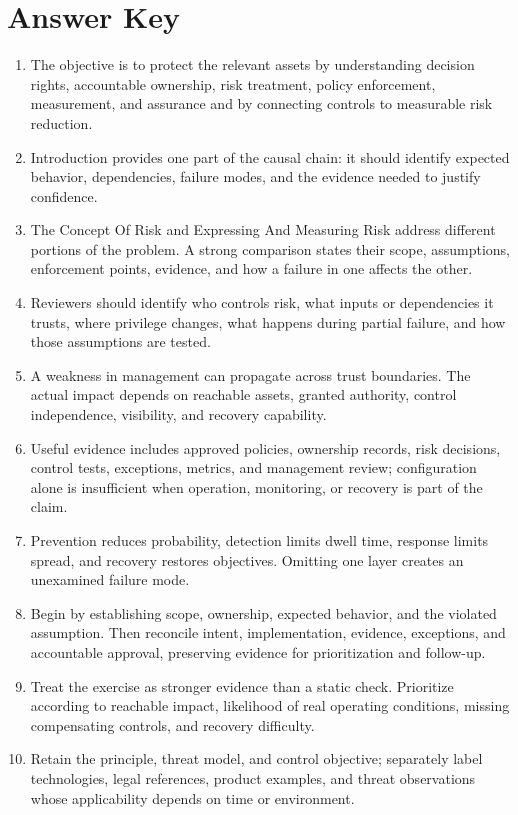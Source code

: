 \documentclass[11pt,letterpaper]{article}
\begin{document}
\section*{Answer Key}
\begin{enumerate}
\item The objective is to protect the relevant assets by understanding decision rights, accountable ownership, risk treatment, policy enforcement, measurement, and assurance and by connecting controls to measurable risk reduction.
\item Introduction provides one part of the causal chain: it should identify expected behavior, dependencies, failure modes, and the evidence needed to justify confidence.
\item The Concept Of Risk and Expressing And Measuring Risk address different portions of the problem. A strong comparison states their scope, assumptions, enforcement points, evidence, and how a failure in one affects the other.
\item Reviewers should identify who controls risk, what inputs or dependencies it trusts, where privilege changes, what happens during partial failure, and how those assumptions are tested.
\item A weakness in management can propagate across trust boundaries. The actual impact depends on reachable assets, granted authority, control independence, visibility, and recovery capability.
\item Useful evidence includes approved policies, ownership records, risk decisions, control tests, exceptions, metrics, and management review; configuration alone is insufficient when operation, monitoring, or recovery is part of the claim.
\item Prevention reduces probability, detection limits dwell time, response limits spread, and recovery restores objectives. Omitting one layer creates an unexamined failure mode.
\item Begin by establishing scope, ownership, expected behavior, and the violated assumption. Then reconcile intent, implementation, evidence, exceptions, and accountable approval, preserving evidence for prioritization and follow-up.
\item Treat the exercise as stronger evidence than a static check. Prioritize according to reachable impact, likelihood of real operating conditions, missing compensating controls, and recovery difficulty.
\item Retain the principle, threat model, and control objective; separately label technologies, legal references, product examples, and threat observations whose applicability depends on time or environment.
\end{enumerate}
\end{document}
